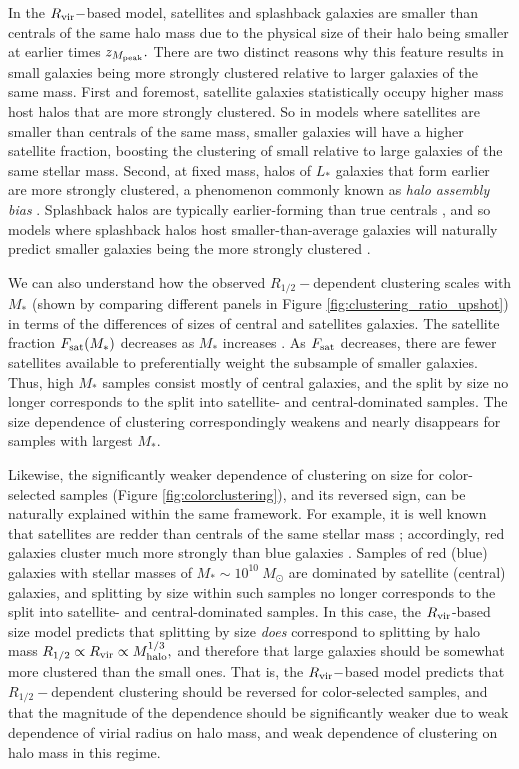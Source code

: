 \documentclass[usenatbib,usegraphicx,letterpaper]{mn2e}
\newcommand{\rhalf}{R_{1/2}}
\newcommand{\mstar}{M_{\ast}}
\newcommand{\zpeak}{z_{M_{\rm peak}}}
\newcommand{\mhalo}{M_{\rm halo}}
\newcommand{\rvir}{R_{\rm vir}}
\begin{document}
In the $\rvir-$based model, satellites and splashback galaxies are smaller than centrals of the same halo mass due to the physical size of their halo being smaller at earlier times $\zpeak.$ There are two distinct reasons why this feature results in small galaxies being more strongly clustered relative to larger galaxies of the same mass. First and foremost, satellite galaxies statistically occupy higher mass host halos that are more strongly clustered. So in models where satellites are smaller than centrals of the same mass, smaller galaxies will have a higher satellite fraction, boosting the clustering of small relative to large galaxies of the same stellar mass. Second, at fixed mass, halos of $L_\ast$ galaxies that form earlier are more strongly clustered, a phenomenon commonly known as {\em halo assembly bias} \citep{gao_white05,wechsler_etal06}. Splashback halos are typically earlier-forming than true centrals \citep{wang_etal09}, and so models where splashback halos host smaller-than-average galaxies will naturally predict smaller galaxies being the more strongly clustered \citep[see][for an example of the splashback-dependence of halo clustering]{sunayama_etal16}. 

We can also understand how the observed $\rhalf-$dependent clustering scales with $\mstar$ (shown by comparing different panels in Figure \ref{fig:clustering_ratio_upshot}) in terms of the differences of sizes of central and satellites galaxies. The satellite fraction $F_{\rm sat}(\mstar)$ decreases as $\mstar$ increases \citep[e.g.,][]{guo_etal11,reddick_etal13}. As $F_{\rm sat}$ decreases, there are fewer satellites available to preferentially weight the subsample of smaller galaxies. Thus,  high $\mstar$ samples consist mostly of central galaxies, and the split by size no longer corresponds to the split into satellite- and central-dominated samples. The size dependence of clustering correspondingly weakens and nearly disappears for samples with largest $\mstar$. 

Likewise, the significantly weaker dependence of clustering on size for color-selected samples (Figure \ref{fig:colorclustering}), and its reversed sign, can be naturally explained within the same framework.  For example, it is well known that satellites are redder than centrals of the same stellar mass \citep[e.g.,][]{vdB_etal08}; accordingly, red galaxies cluster much more strongly than  blue galaxies \citep[e.g.,][]{zehavi_etal11}. Samples of red (blue) galaxies with stellar masses of $\mstar\sim 10^{10}\ M_\odot$ are dominated by satellite (central) galaxies, and splitting by size within such samples no longer corresponds to the split into satellite- and central-dominated samples. In this case, the $\rvir$-based size model predicts that splitting by size {\em does} correspond to splitting by halo mass $\rhalf\propto\rvir\propto\mhalo^{1/3},$ and therefore that large galaxies should be somewhat more clustered than the small ones. That is, the $\rvir-$based model predicts that $\rhalf-$dependent clustering should be reversed for color-selected samples, and that the magnitude of the dependence should be significantly weaker due to weak dependence of virial radius on halo mass, and weak dependence of clustering on halo mass in this regime. 
\end{document}
